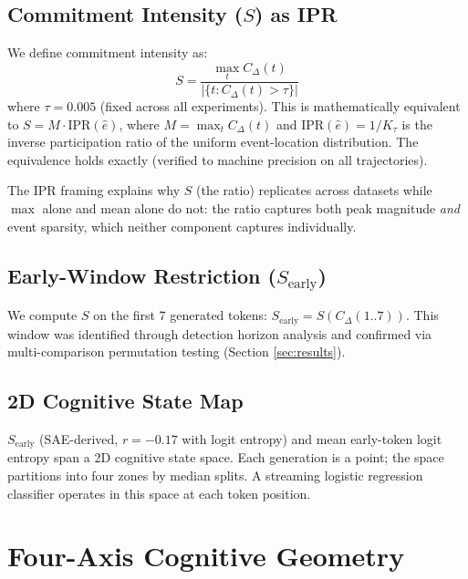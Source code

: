 \documentclass{article}
\begin{document}
\subsection{Commitment Intensity ($S$) as IPR}

We define commitment intensity as:
\begin{equation}
S = \frac{\max_t C_\Delta(t)}{|\{t : C_\Delta(t) > \tau\}|}
\end{equation}
where $\tau = 0.005$ (fixed across all experiments). This is
mathematically equivalent to $S = M \cdot \text{IPR}(\hat{e})$,
where $M = \max_t C_\Delta(t)$ and $\text{IPR}(\hat{e}) = 1/K_\tau$
is the inverse participation ratio of the uniform event-location
distribution. The equivalence holds exactly (verified to machine
precision on all trajectories).

The IPR framing explains why $S$ (the ratio) replicates across datasets
while $\max$ alone and $\text{mean}$ alone do not: the ratio captures
both peak magnitude \textit{and} event sparsity, which neither component
captures individually.

\subsection{Early-Window Restriction ($S_\text{early}$)}

We compute $S$ on the first 7 generated tokens: $S_\text{early} =
S(C_\Delta(1..7))$. This window was identified through detection horizon
analysis and confirmed via multi-comparison permutation testing (Section
\ref{sec:results}).

\subsection{2D Cognitive State Map}

$S_\text{early}$ (SAE-derived, $r = -0.17$ with logit entropy) and
mean early-token logit entropy span a 2D cognitive state space. Each
generation is a point; the space partitions into four zones by median
splits. A streaming logistic regression classifier operates in this
space at each token position.

\section{Four-Axis Cognitive Geometry}
\end{document}
